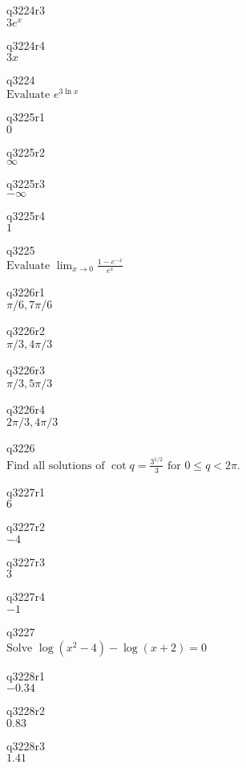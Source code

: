 q3224r3\\
\(\displaystyle 3e^x \)

q3224r4\\
\(\displaystyle 3x \)

q3224\\
\(\displaystyle \text{Evaluate } e^{3 \ln x} \)

q3225r1\\
\(\displaystyle 0 \)

q3225r2\\
\(\displaystyle \infty \)

q3225r3\\
\(\displaystyle -\infty \)

q3225r4\\
\(\displaystyle 1 \)

q3225\\
\(\displaystyle \text{Evaluate } \lim_{x \rightarrow 0} \frac{1 - e^{-x}}{e^x} \)

q3226r1\\
\(\displaystyle \pi/6, 7\pi/6 \)

q3226r2\\
\(\displaystyle \pi/3, 4\pi/3 \)

q3226r3\\
\(\displaystyle \pi/3, 5\pi/3 \)

q3226r4\\
\(\displaystyle 2\pi/3, 4\pi/3 \)

q3226\\
\(\displaystyle \text{Find all solutions of } \cot q = \frac{3^{1/2}}{3} \text{ for } 0 \leq q < 2\pi. \)

q3227r1\\
\(\displaystyle 6 \)

q3227r2\\
\(\displaystyle -4 \)

q3227r3\\
\(\displaystyle 3 \)

q3227r4\\
\(\displaystyle -1 \)

q3227\\
\(\displaystyle \text{Solve } \log(x^2 - 4) - \log(x+2) = 0 \)

q3228r1\\
\(\displaystyle -0.34 \)

q3228r2\\
\(\displaystyle 0.83 \)

q3228r3\\
\(\displaystyle 1.41 \)

